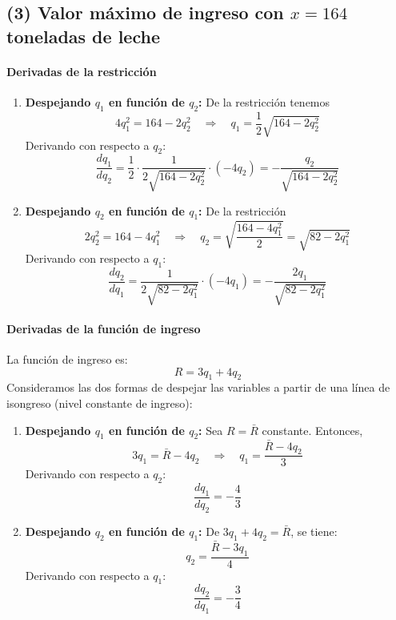 \documentclass{article}
\begin{document}
\subsection*{(3) Valor máximo de ingreso con \(x = 164\) toneladas de leche}


\bigskip
\paragraph{Derivadas de la restricción}

\begin{enumerate}
    \item \textbf{Despejando \(q_1\) en función de \(q_2\):}  
    De la restricción tenemos
    \[
    4q_1^2 = 164 - 2q_2^2 
    \quad \Longrightarrow \quad 
    q_1 = \frac{1}{2}\sqrt{164 - 2q_2^2}
    \]
    Derivando con respecto a \(q_2\):
    \[
    \frac{dq_1}{dq_2} = \frac{1}{2}\cdot\frac{1}{2\sqrt{164-2q_2^2}}\cdot(-4q_2)
    = -\frac{q_2}{\sqrt{164-2q_2^2}}
    \]
    
    \item \textbf{Despejando \(q_2\) en función de \(q_1\):}  
    De la restricción
    \[
    2q_2^2 = 164 - 4q_1^2 
    \quad \Longrightarrow \quad 
    q_2 = \sqrt{\frac{164-4q_1^2}{2}}
    = \sqrt{82 - 2q_1^2}
    \]
    Derivando con respecto a \(q_1\):
    \[
    \frac{dq_2}{dq_1} 
    = \frac{1}{2\sqrt{82-2q_1^2}} \cdot (-4q_1)
    = -\frac{2q_1}{\sqrt{82-2q_1^2}}
    \]
\end{enumerate}

\bigskip
\paragraph{Derivadas de la función de ingreso}

La función de ingreso es:
\[
R = 3q_1 + 4q_2
\]
Consideramos las dos formas de despejar las variables a partir de una línea de isongreso (nivel constante de ingreso):





\begin{enumerate}
    \item \textbf{Despejando \(q_1\) en función de \(q_2\):}  
    Sea \(R = \bar{R}\) constante. Entonces,
    \[
    3q_1 = \bar{R} - 4q_2 
    \quad \Longrightarrow \quad 
    q_1 = \frac{\bar{R} - 4q_2}{3}
    \]
    Derivando con respecto a \(q_2\):
    \[
    \frac{dq_1}{dq_2} = -\frac{4}{3}
    \]
    
    \item \textbf{Despejando \(q_2\) en función de \(q_1\):}  
    De \(3q_1 + 4q_2 = \bar{R}\), se tiene:
    \[
    q_2 = \frac{\bar{R} - 3q_1}{4}
    \]
    Derivando con respecto a \(q_1\):
    \[
    \frac{dq_2}{dq_1} = -\frac{3}{4}
    \]
\end{enumerate}
\end{document}
